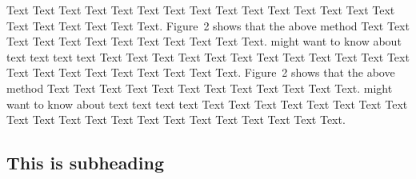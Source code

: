 \documentclass{bioinfo}
\begin{document}
\begin{methods}
        Text Text Text Text Text Text Text Text Text Text Text Text Text
        Text Text Text Text Text Text Text Text.
        Figure~2\vphantom{\ref{fig:02}} shows that the above method Text
        Text Text Text Text Text Text Text Text Text Text Text.
        \citealp{Boffelli03} might want to know about text text text text
        Text Text Text Text Text Text Text Text Text Text Text Text Text
        Text Text Text Text Text Text Text Text.
        Figure~2\vphantom{\ref{fig:02}} shows that the above method Text
        Text Text Text Text Text Text Text Text Text Text Text.
        \citealp{Boffelli03} might want to know about text text text text
        Text Text Text Text Text Text Text Text Text Text Text Text Text
        Text Text Text Text Text Text Text Text.

        \subsection{This is subheading}


\end{methods}
\end{document}
